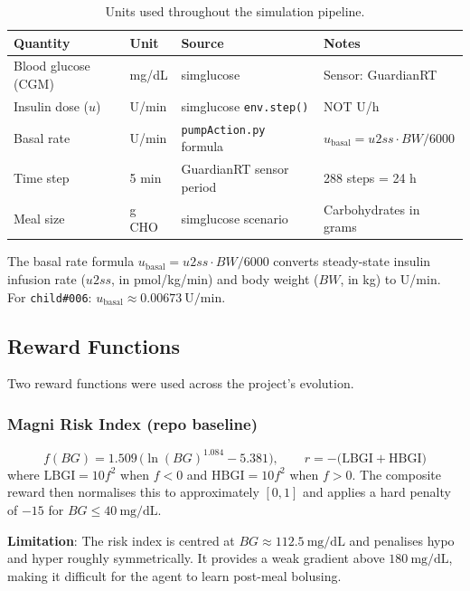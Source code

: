 \documentclass[11pt,a4paper]{article}
\begin{document}
\begin{table}[H]
\centering
\begin{tabular}{llll}
\toprule
\textbf{Quantity} & \textbf{Unit} & \textbf{Source} & \textbf{Notes} \\
\midrule
Blood glucose (CGM) & mg/dL & simglucose & Sensor: GuardianRT \\
Insulin dose ($u$)  & U/min & simglucose \texttt{env.step()} & NOT U/h \\
Basal rate          & U/min & \texttt{pumpAction.py} formula & $u_\text{basal} = u2ss \cdot BW / 6000$ \\
Time step           & 5 min & GuardianRT sensor period & 288 steps = 24 h \\
Meal size           & g CHO & simglucose scenario & Carbohydrates in grams \\
\bottomrule
\end{tabular}
\caption{Units used throughout the simulation pipeline.}
\label{tab:units}
\end{table}

The basal rate formula $u_\text{basal} = u2ss \cdot BW / 6000$ converts steady-state insulin
infusion rate ($u2ss$, in pmol/kg/min) and body weight ($BW$, in kg) to U/min. For
\texttt{child\#006}: $u_\text{basal} \approx 0.00673\ \text{U/min}$.

\subsection{Reward Functions}

Two reward functions were used across the project's evolution.

\subsubsection*{Magni Risk Index (repo baseline)}
\begin{equation}
    f(BG) = 1.509\,\bigl(\ln(BG)^{1.084} - 5.381\bigr), \qquad
    r = -\bigl(\text{LBGI} + \text{HBGI}\bigr)
\end{equation}
where $\text{LBGI} = 10 f^2$ when $f < 0$ and $\text{HBGI} = 10 f^2$ when $f > 0$.
The composite reward then normalises this to approximately $[0, 1]$ and applies a hard
penalty of $-15$ for $BG \le 40\ \text{mg/dL}$.

\textbf{Limitation}: The risk index is centred at $BG \approx 112.5\ \text{mg/dL}$ and
penalises hypo and hyper roughly symmetrically. It provides a weak gradient above
$180\ \text{mg/dL}$, making it difficult for the agent to learn post-meal bolusing.
\end{document}
